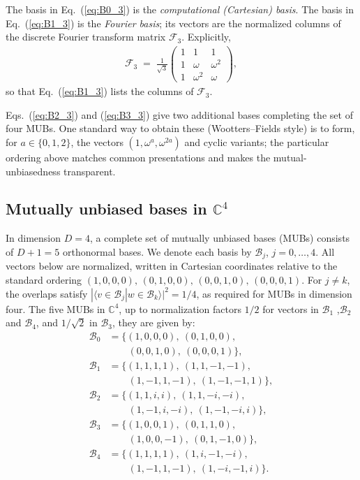 \documentclass[%
  reprint,
  superscriptaddress,
  showpacs,
  showkeys,
  amsmath,amssymb,
  pra,
  longbibliography,
  floatfix,
  x11names
]{revtex4-2}
\begin{document}
The basis in Eq.~(\ref{eq:B0_3}) is the \textit{computational (Cartesian) basis}.
The basis in Eq.~(\ref{eq:B1_3}) is the \textit{Fourier basis}; its vectors are the normalized columns of the discrete Fourier transform matrix \(\mathcal{F}_3\).  Explicitly,
\begin{align}
\mathcal{F}_3 \;=\; \frac{1}{\sqrt{3}}
\begin{pmatrix}
1 & 1 & 1 \\
1 & \omega & \omega^2 \\
1 & \omega^2 & \omega
\end{pmatrix},
\label{eq:F3}
\end{align}
so that Eq.~(\ref{eq:B1_3}) lists the columns of \(\mathcal{F}_3\).

Eqs.~(\ref{eq:B2_3}) and (\ref{eq:B3_3}) give two additional bases completing the set of four MUBs.
One standard way to obtain these (Wootters--Fields style) is to form, for \(a\in\{0,1,2\}\), the vectors
\((1,\omega^{a},\omega^{2a})\) and cyclic variants; the particular ordering above matches common presentations and makes the mutual-unbiasedness transparent.





\subsection{Mutually unbiased bases in \(\mathbb{C}^4\)}
\label{appendix:MUBsD4}

In dimension \(D=4\), a complete set of mutually unbiased bases (MUBs) consists of \(D+1=5\) orthonormal bases.
We denote each basis by \(\mathcal{B}_j\), \(j=0,\dots,4\).
All vectors below are normalized, written in Cartesian coordinates relative to the standard ordering
\((1,0,0,0),\,(0,1,0,0),\,(0,0,1,0),\,(0,0,0,1)\).
For \(j\neq k\), the overlaps satisfy
\(|\langle v\in\mathcal{B}_j | w\in\mathcal{B}_k\rangle|^2 = 1/4\), as required for MUBs in dimension four.
The five MUBs in $\mathbb{C}^4$,
up to normalization factors $1/2$ for vectors in $\mathcal{B}_1$ ,$\mathcal{B}_2$ and $\mathcal{B}_4$,
and $ {1}/{\sqrt{2}}$ in $\mathcal{B}_3$, they are given by:
\begin{align}
\mathcal{B}_0 &= \{ (1,0,0,0),\ (0,1,0,0),\nonumber \\ &\qquad (0,0,1,0),\ (0,0,0,1) \},
\label{eq:B0} \\
%
\mathcal{B}_1 &= \{(1,1,1,1),\ (1,1,-1,-1),\nonumber \\ &\qquad  (1,-1,1,-1),\ (1,-1,-1,1)\},
\label{eq:B1} \\
%
\mathcal{B}_2 &= \{(1,1,i,i),\ (1,1,-i,-i),\nonumber \\ &\qquad  (1,-1,i,-i),\ (1,-1,-i,i)\},
%
\label{eq:B2} \\
%
\mathcal{B}_3 &= \{(1,0,0,1),\ (0,1,1,0),\nonumber \\ &\qquad  (1,0,0,-1),\ (0,1,-1,0)\},
\label{eq:B3} \\
%
\mathcal{B}_4 &= \{(1,1,1,1),\ (1,i,-1,-i),\nonumber \\ &\qquad  (1,-1,1,-1),\ (1,-i,-1,i)\}.
\label{eq:B4}
\end{align}
\end{document}
